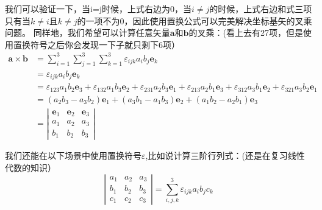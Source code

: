 \documentclass{ctexart}
\begin{document}
    我们可以验证一下，当i=j时候，上式右边为0，当$i \neq j$的时候，上式右边和式三项只有当$k \neq i$且$k \neq j$的一项不为0，因此使用置换公式可以完美解决坐标基矢的叉乘问题。
    同样地，我们希望可以计算任意矢量$\boldsymbol{a}$和$\boldsymbol{b}$的叉乘：(看上去有27项，但是使用置换符号之后你会发现一下子就只剩下6项）
    $$
    \begin{aligned}
    \boldsymbol{a} \times \boldsymbol{b}&=\sum_{i=1}^{3} \sum_{j=1}^{3} \sum_{k=1}^{3} \varepsilon_{i j k} a_{i} b_{j} \boldsymbol{e}_{k} 
      \\
      &=\varepsilon_{i j k} a_{i} b_{j} \boldsymbol{e}_{k} 
      \\
       &=\varepsilon_{123}a_{1}b_{2}\boldsymbol{e}_{3}+\varepsilon_{132}a_{1}b_{3}\boldsymbol{e}_{2}+\varepsilon_{231}a_{2}b_{3}\boldsymbol{e}_{1}+\varepsilon_{213}a_{2}b_{1}\boldsymbol{e}_{3}+\varepsilon_{312}a_{3}b_{1}\boldsymbol{e}_{2}+\varepsilon_{321}a_{3}b_{2}\boldsymbol{e}_{1} 
       \\
       &= (a_{2}b_{3}-a_{3}b_{2})\boldsymbol{e}_{1}+(a_{3}b_{1}-a_{1}b_{3})\boldsymbol{e}_{2}+(a_{1}b_{2}-a_{2}b_{1})\boldsymbol{e}_{3}
       \\
       &=\left|\begin{array}{lll}
      \boldsymbol{e}_{1} & \boldsymbol{e}_{2} & \boldsymbol{e}_{3} \\
       a_{1} & a_{2} & a_{3} \\
       b_{1} & b_{2} & b_{3}
      \end{array}\right|
    \end{aligned}
   
     $$
     
     \par
     我们还能在以下场景中使用置换符号$\varepsilon$,比如说计算三阶行列式：(还是在复习线性代数的知识）
     $$
    \left|\begin{array}{lll}
    a_{1} & a_{2} & a_{3} \\
    b_{1} & b_{2} & b_{3} \\
    c_{1} & c_{2} & c_{3}
    \end{array}\right|=\sum_{i, j, k}^{3} \varepsilon_{i j k} a_{i} b_{j} c_{k}
    $$
    
    
\end{document}
